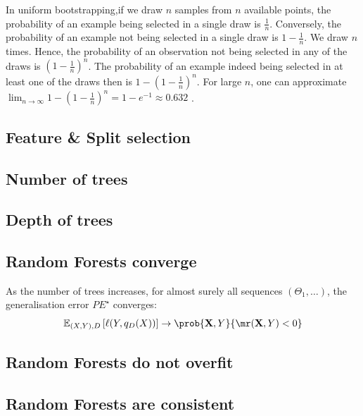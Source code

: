 \documentclass[../main.tex]{subfiles}
\begin{document}
In uniform bootstrapping,if we draw $n$ samples from $n$ available points, the probability of an example being selected in a single draw is $\frac{1}{n}$. Conversely, the probability of an example not being selected in a single draw is $1-\frac{1}{n}$. We draw $n$ times. Hence, the probability of an observation not being selected in any of the draws is $(1-\frac{1}{n})^n$. The probability of an example indeed being selected in at least one of the draws then is $1 - (1 - \frac{1}{n})^n$.  For large $n$, one can approximate $\lim_{ n \to \infty }1-(1-\frac{1}{n})^n = 1- e^{-1} \approx 0.632$ \cite{todo}.


\subsection{Feature \& Split selection}


\subsection{Number of trees}

\subsection{Depth of trees}

\subsection{Random Forests converge}


As the number of trees increases, for almost surely all sequences $(\Theta_{1}, \dots)$, the generalisation error $PE^\star$ converges:
$$
\mathbb{E}_{(X,Y), D}\left[ \ell(Y, q_{D}(X)) \right]  \to
\prob{\vec{X}, Y}{
\mr(\vec{X}, Y)  < 0
}
$$

\subsection{Random Forests do not overfit}

\subsection{Random Forests are consistent}
\end{document}
